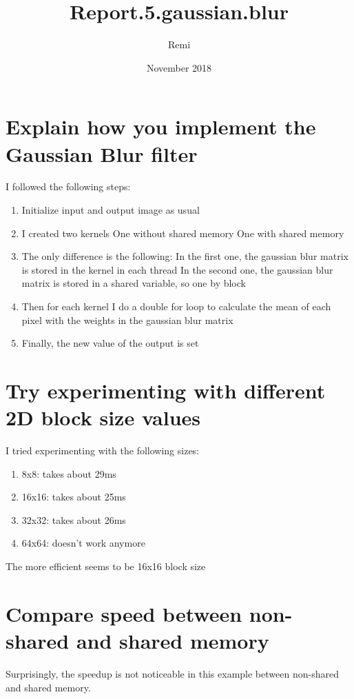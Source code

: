 \documentclass{article}
\title{ Report.5.gaussian.blur}
\author{Remi}
\date{November 2018}
\begin{document}
\maketitle

\section{Explain how you implement the Gaussian Blur filter}

I followed the following steps:
\begin{enumerate}  
\item Initialize input and output image as usual
\item I created two kernels
    \subitem One without shared memory
    \subitem One with shared memory
\item The only difference is the following:
    \subitem In the first one, the gaussian blur matrix is stored in the kernel in each thread
    \subitem In the second one, the gaussian blur matrix is stored in a shared variable, so one by block
\item Then for each kernel I do a double for loop to calculate the mean of each pixel with the weights in the gaussian blur matrix
\item Finally, the new value of the output is set
\end{enumerate}

\section{Try experimenting with different 2D block size values}

I tried experimenting with the following sizes:
\begin{enumerate} 
\item 8x8: takes about 29ms
\item 16x16: takes about 25ms
\item 32x32: takes about 26ms
\item 64x64: doesn't work anymore
\end{enumerate}
The more efficient seems to be 16x16 block size

\section{Compare speed between non-shared and shared memory}
Surprisingly, the speedup is not noticeable in this example between non-shared and shared memory.
\end{document}
